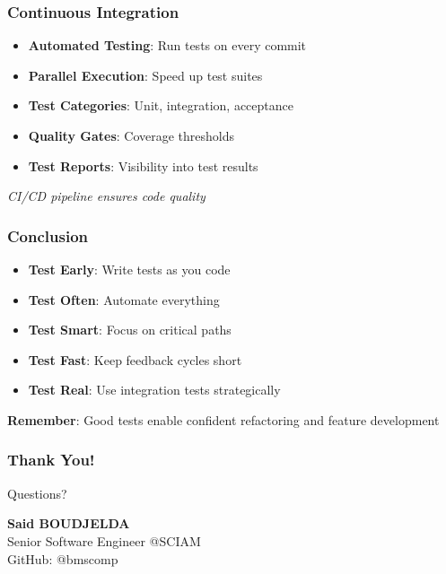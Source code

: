 \documentclass{beamer}
\begin{document}
\begin{frame}
\frametitle{Continuous Integration}

\begin{itemize}
  \item \textbf{Automated Testing}: Run tests on every commit
  \item \textbf{Parallel Execution}: Speed up test suites
  \item \textbf{Test Categories}: Unit, integration, acceptance
  \item \textbf{Quality Gates}: Coverage thresholds
  \item \textbf{Test Reports}: Visibility into test results
\end{itemize}

\vspace{0.3cm}
\textit{CI/CD pipeline ensures code quality}

\end{frame}

\begin{frame}
\frametitle{Conclusion}

\begin{itemize}
  \item \textbf{Test Early}: Write tests as you code
  \item \textbf{Test Often}: Automate everything
  \item \textbf{Test Smart}: Focus on critical paths
  \item \textbf{Test Fast}: Keep feedback cycles short
  \item \textbf{Test Real}: Use integration tests strategically
\end{itemize}

\vspace{0.5cm}
\textbf{Remember}: Good tests enable confident refactoring and feature development

\end{frame}

\begin{frame}
\frametitle{Thank You!}

\begin{center}
\Large Questions?

\vspace{1cm}

\textbf{Said BOUDJELDA}\\
Senior Software Engineer @SCIAM\\
GitHub: @bmscomp

\vspace{0.5cm}
\end{center}

\end{frame}
\end{document}
